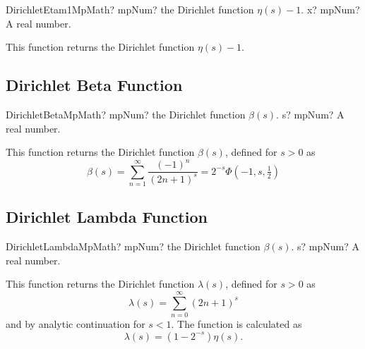 \begin{mpFunctionsExtract}
	\mpFunctionOneNotImplemented
	{DirichletEtam1MpMath? mpNum? the Dirichlet function $\eta(s) - 1$.}
	{x? mpNum? A real number.}
\end{mpFunctionsExtract}

\vspace{0.3cm}
This function returns the Dirichlet function $\eta(s) - 1$.




\subsection{Dirichlet Beta Function}

\begin{mpFunctionsExtract}
	\mpFunctionOneNotImplemented
	{DirichletBetaMpMath? mpNum? the Dirichlet function $\beta(s)$.}
	{s? mpNum? A real number.}
\end{mpFunctionsExtract}

\vspace{0.3cm}
This function returns the Dirichlet function $\beta(s)$, defined for $s > 0$ as
\begin{equation}
	\beta(s) = \sum_{n=1}^\infty \frac{(-1)^{n}}{(2n+1)^s} = 2^{-s} \Phi\left(-1,s,\tfrac{1}{2} \right)
\end{equation}




\subsection{Dirichlet Lambda Function}

\begin{mpFunctionsExtract}
	\mpFunctionOneNotImplemented
	{DirichletLambdaMpMath? mpNum? the Dirichlet function $\beta(s)$.}
	{s? mpNum? A real number.}
\end{mpFunctionsExtract}

\vspace{0.3cm}
This function returns the Dirichlet function $\lambda(s)$, defined for $s > 0$ as
\begin{equation}
	\lambda(s) = \sum_{n=0}^\infty (2n+1)^s
\end{equation}
and by analytic continuation for $s<1$. The function is calculated as
\begin{equation}
	\lambda(s) = (1-2^{-s}) \eta(s).
\end{equation}








